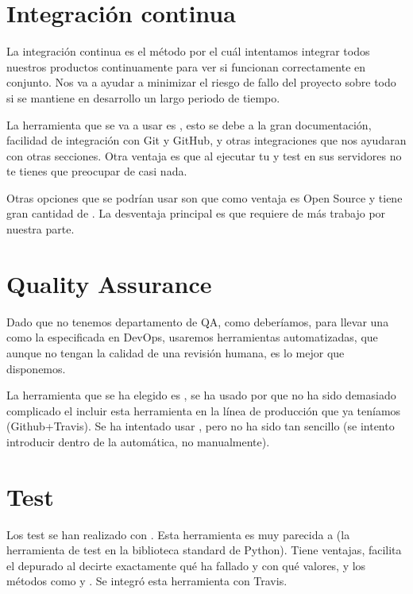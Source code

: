 \section{Integración continua}

La integración continua es el método por el cuál intentamos integrar todos nuestros productos continuamente para ver si funcionan correctamente en conjunto. Nos va a ayudar a minimizar el riesgo de fallo del proyecto sobre todo si se mantiene en desarrollo un largo periodo de tiempo.

La herramienta que se va a usar es , esto se debe a la gran documentación, facilidad de integración con Git y GitHub, y otras integraciones que nos ayudaran con otras secciones. Otra ventaja es que al ejecutar tu  y test en sus servidores no te tienes que preocupar de casi nada.

Otras opciones que se podrían usar son  que como ventaja es Open Source y tiene gran cantidad de . La desventaja principal es que requiere de más trabajo por nuestra parte.


\section{Quality Assurance}

Dado que no tenemos departamento de QA, como deberíamos, para llevar una  como la especificada en DevOps, usaremos herramientas automatizadas, que aunque no tengan la calidad de una revisión humana, es lo mejor que disponemos. 

La herramienta que se ha elegido es , se ha usado por que no ha sido demasiado complicado el incluir esta herramienta en la línea de producción que ya teníamos (Github+Travis). Se ha intentado usar , pero no ha sido tan sencillo (se intento introducir dentro de la  automática, no manualmente). 


\section{Test}

Los test se han realizado con . Esta herramienta es muy parecida a  (la herramienta de test en la biblioteca standard de Python). Tiene ventajas, facilita el depurado al decirte exactamente qué ha fallado y con qué valores, y los métodos como  y . Se integró esta herramienta con Travis.

